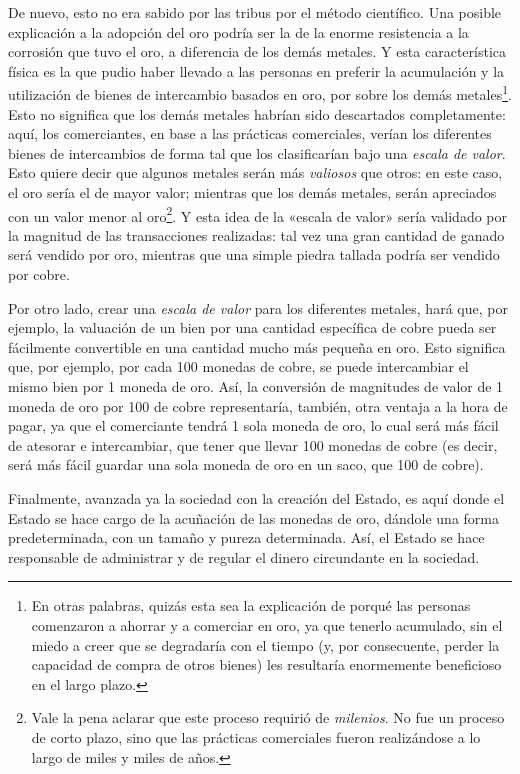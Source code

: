 \documentclass[12pt,a4paper,twoside]{book}
\begin{document}
De nuevo, esto no era sabido por las tribus por el método científico. Una posible explicación a la adopción del oro podría ser la de la enorme resistencia a la corrosión que tuvo el oro, a diferencia de los demás metales. Y esta característica física es la que pudio haber llevado a las personas en preferir la acumulación y la utilización de bienes de intercambio basados en oro, por sobre los demás metales\footnote{En otras palabras, quizás esta sea la explicación de porqué las personas comenzaron a ahorrar y a comerciar en oro, ya que tenerlo acumulado, sin el miedo a creer que se degradaría con el tiempo (y, por consecuente, perder la capacidad de compra de otros bienes) les resultaría enormemente beneficioso en el largo plazo.}. Esto no significa que los demás metales habrían sido descartados completamente: aquí, los comerciantes, en base a las prácticas comerciales, verían los diferentes bienes de intercambios de forma tal que los clasificarían bajo una \textit{escala de valor}. Esto quiere decir que algunos metales serán más \textit{valiosos} que otros: en este caso, el oro sería el de mayor valor; mientras que los demás metales, serán apreciados con un valor menor al oro\footnote{Vale la pena aclarar que este proceso requirió de \textit{milenios}. No fue un proceso de corto plazo, sino que las prácticas comerciales fueron realizándose a lo largo de miles y miles de años.}. Y esta idea de la «escala de valor» sería validado por la magnitud de las transacciones realizadas: tal vez una gran cantidad de ganado será vendido por oro, mientras que una simple piedra tallada podría ser vendido por cobre.

Por otro lado, crear una \textit{escala de valor} para los diferentes metales, hará que, por ejemplo, la valuación de un bien por una cantidad específica de cobre pueda ser fácilmente convertible en una cantidad mucho más pequeña en oro. Esto significa que, por ejemplo, por cada 100 monedas de cobre, se puede intercambiar el mismo bien por 1 moneda de oro. Así, la conversión de magnitudes de valor de 1 moneda de oro por 100 de cobre representaría, también, otra ventaja a la hora de pagar, ya que el comerciante tendrá 1 sola moneda de oro, lo cual será más fácil de atesorar e intercambiar, que tener que llevar 100 monedas de cobre (es decir, será más fácil guardar una sola moneda de oro en un saco, que 100 de cobre).

Finalmente, avanzada ya la sociedad con la creación del Estado, es aquí donde el Estado se hace cargo de la acuñación de las monedas de oro, dándole una forma predeterminada, con un tamaño y pureza determinada. Así, el Estado se hace responsable de administrar y de regular el dinero circundante en la sociedad.
\end{document}
